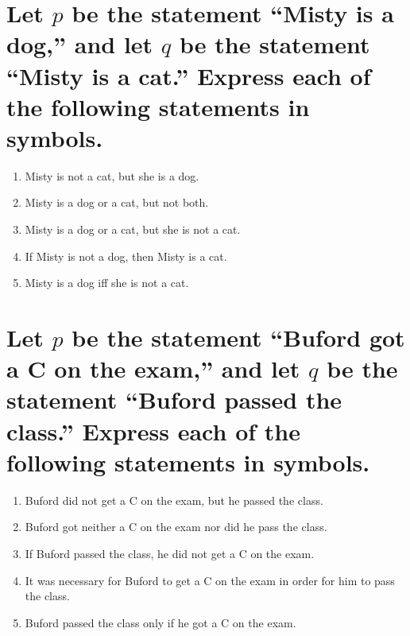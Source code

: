 \documentclass[11pt]{article} %
\begin{document}
\section{Let $p$ be the statement ``Misty is a dog,'' and let $q$ be the statement ``Misty is a cat.'' Express each of the following statements in symbols.}
\begin{enumerate}
\item Misty is not a cat, but she is a dog.
\item Misty is a dog or a cat, but not both.
\item Misty is a dog or a cat, but she is not a cat.
\item If Misty is not a dog, then Misty is a cat.
\item Misty is a dog iff she is not a cat.
\end{enumerate}

\section{Let $p$ be the statement ``Buford got a C on the exam,'' and let $q$ be the statement ``Buford passed the class.'' Express each of the following statements in symbols.}
\begin{enumerate}
\item Buford did not get a C on the exam, but he passed the class.
\item Buford got neither a C on the exam nor did he pass the class.
\item If Buford passed the class, he did not get a C on the exam.
\item It was necessary for Buford to get a C on the exam in order for him to pass the class.
\item Buford passed the class only if he got a C on the exam.
\end{enumerate}
\end{document}
